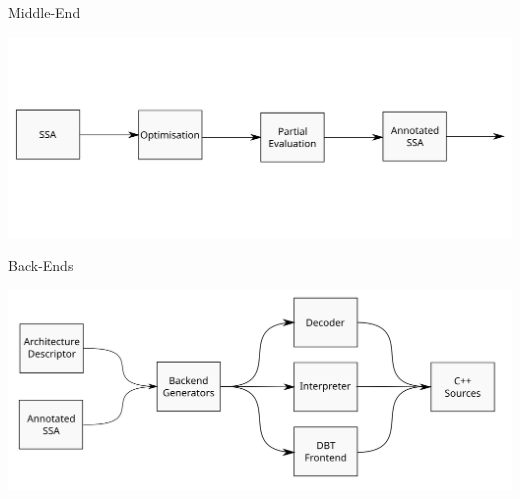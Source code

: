 \begin{frame}{Middle-End}

\includegraphics[width=\textwidth]{figures/gensim-middle}

\end{frame}

\begin{frame}{Back-Ends}

\includegraphics[width=\textwidth]{figures/gensim-backend}

\end{frame}
